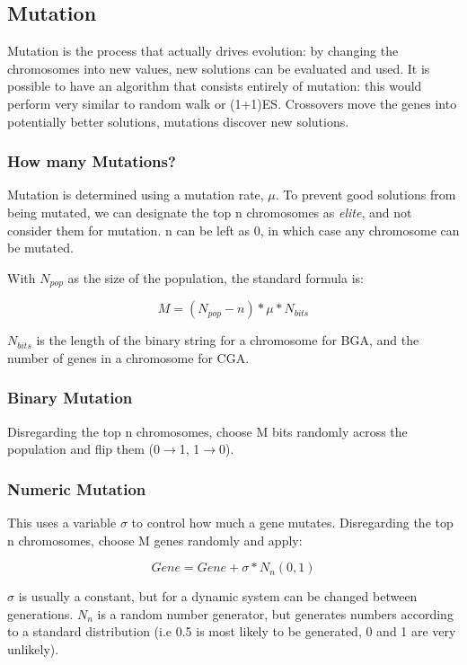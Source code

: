 \subsection{Mutation}
Mutation is the process that actually drives evolution: by changing the chromosomes into new values, new solutions can be evaluated and used. It is possible to have an algorithm that consists entirely of mutation: this would perform very similar to random walk or (1+1)ES. Crossovers move the genes into potentially better solutions, mutations discover new solutions. 

\subsubsection{How many Mutations?}
Mutation is determined using a mutation rate, $\mu$. To prevent good solutions from being mutated, we can designate the top n chromosomes as \emph{elite}, and not consider them for mutation. n can be left as 0, in which case any chromosome can be mutated. 

With $N_{pop}$ as the size of the population, the standard formula is:

\begin{equation}
    M = (N_{pop} - n) * \mu * N_{bits}
\end{equation}

$N_{bits}$ is the length of the binary string for a chromosome for BGA, and the number of genes in a chromosome for CGA.

\subsubsection{Binary Mutation}
Disregarding the top n chromosomes, choose M bits randomly across the population and flip them (0$\rightarrow$1, 1$\rightarrow$0). 

\subsubsection{Numeric Mutation}
This uses a variable $\sigma$ to control how much a gene mutates. Disregarding the top n chromosomes, choose M genes randomly and apply:

\begin{equation}
    Gene = Gene + \sigma * N_n(0,1)
\end{equation}

$\sigma$ is usually a constant, but for a dynamic system can be changed between generations. $N_n$ is a random number generator, but generates numbers according to a standard distribution (i.e 0.5 is most likely to be generated, 0 and 1 are very unlikely). 